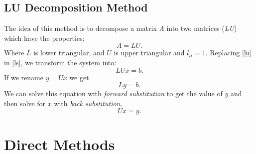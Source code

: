 \documentclass[a4paper,10pt]{report}
\begin{document}
\subsection*{LU Decomposition Method}
The idea of this method is to decompose a matrix \emph{A} into two matrices (\emph{LU}) which have the properties:
\begin{equation}\label{lu}
 A=LU.
\end{equation}
Where $L$ is lower triangular, and $U$ is upper triangular and $l_{ii}=1$.
Replacing \eqref{lu} in \eqref{ls}, we transform the system into:
\begin{equation*}
 LUx=b.
\end{equation*}
If we rename $y=Ux$ we get
\begin{equation*}
 Ly=b.
\end{equation*}
We can solve this equation with \emph{forward substitution} to get the value of $y$ and then solve for $x$ with \emph{back substitution}.
\begin{equation*}
 Ux=y.
\end{equation*}

\section{Direct Methods}
\end{document}
